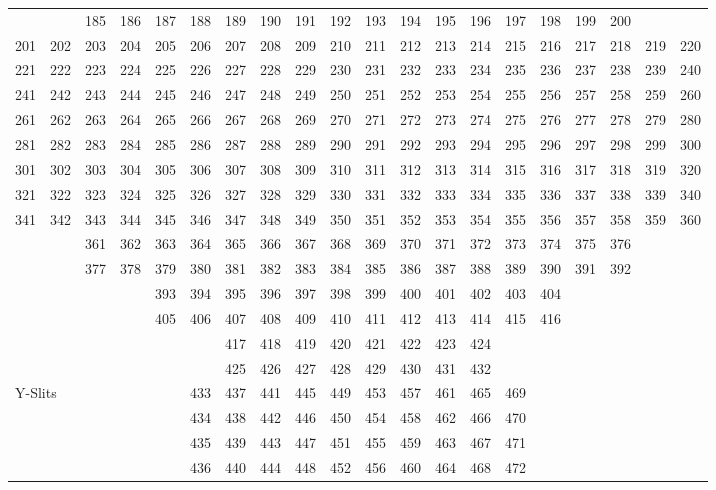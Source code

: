 \begin{figure}
\begin{center}
{\begin{tabular}{*{20}{r}}
&& 185 & 186 & 187 & 188 & 189 & 190 & 191 & 192 & 193 & 194 & 195 & 196 & 197
& 198 & 199 & 200 \\
201 & 202 & 203 & 204 & 205 & 206 & 207 & 208 & 209 & 210 & 211 & 212 & 213 &
214 & 215 & 216 & 217 & 218 & 219 & 220 \\
221 & 222 & 223 & 224 & 225 & 226 & 227 & 228 & 229 & 230 & 231 & 232 & 233 &
234 & 235 & 236 & 237 & 238 & 239 & 240 \\
241 & 242 & 243 & 244 & 245 & 246 & 247 & 248 & 249 & 250 & 251 & 252 & 253 &
254 & 255 & 256 & 257 & 258 & 259 & 260 \\
261 & 262 & 263 & 264 & 265 & 266 & 267 & 268 & 269 & 270 & 271 & 272 & 273 &
274 & 275 & 276 & 277 & 278 & 279 & 280 \\
281 & 282 & 283 & 284 & 285 & 286 & 287 & 288 & 289 & 290 & 291 & 292 & 293 &
294 & 295 & 296 & 297 & 298 & 299 & 300 \\
301 & 302 & 303 & 304 & 305 & 306 & 307 & 308 & 309 & 310 & 311 & 312 & 313 &
314 & 315 & 316 & 317 & 318 & 319 & 320 \\
321 & 322 & 323 & 324 & 325 & 326 & 327 & 328 & 329 & 330 & 331 & 332 & 333 &
334 & 335 & 336 & 337 & 338 & 339 & 340 \\
341 & 342 & 343 & 344 & 345 & 346 & 347 & 348 & 349 & 350 & 351 & 352 & 353 &
354 & 355 & 356 & 357 & 358 & 359 & 360 \\
&& 361 & 362 & 363 & 364 & 365 & 366 & 367 & 368 & 369 & 370 & 371 & 372 & 373 &
374 & 375 & 376 \\
&& 377 & 378 & 379 & 380 & 381 & 382 & 383 & 384 & 385 & 386 & 387 & 388 & 389
& 390 & 391 & 392 \\
&&&& 393 & 394 & 395 & 396 & 397 & 398 & 399 & 400 & 401 & 402 & 403 & 404 \\
&&&& 405 & 406 & 407 & 408 & 409 & 410 & 411 & 412 & 413 & 414 & 415 & 416 \\
&&&&&& 417 & 418 & 419 & 420 & 421 & 422 & 423 & 424 \\
&&&&&& 425 & 426 & 427 & 428 & 429 & 430 & 431 & 432 \\ \hline
\multicolumn{5}{l}{Y-Slits} 
    & 433 & 437 & 441 & 445 & 449 & 453 & 457 & 461 & 465 & 469 \\
&&&&& 434 & 438 & 442 & 446 & 450 & 454 & 458 & 462 & 466 & 470 \\
&&&&& 435 & 439 & 443 & 447 & 451 & 455 & 459 & 463 & 467 & 471 \\
&&&&& 436 & 440 & 444 & 448 & 452 & 456 & 460 & 464 & 468 & 472 \\

\end{tabular}}
\end{center}
\end{figure}

